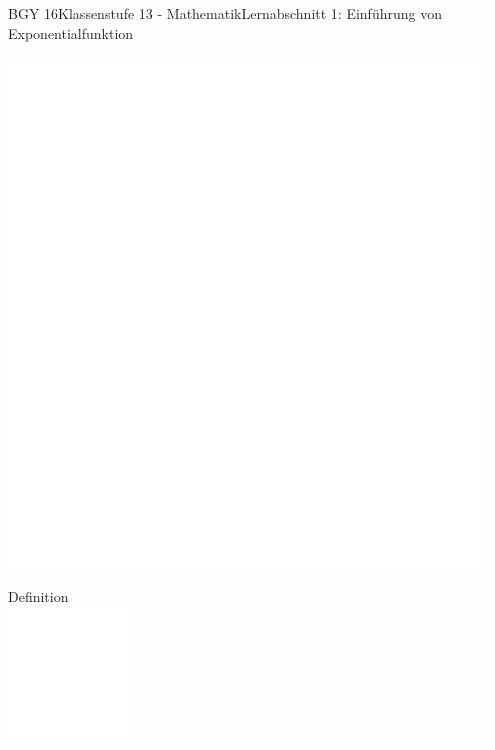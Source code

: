 \documentclass[oneside,openany,headings=optiontotoc,11pt,numbers=noenddot]{scrreprt}
\begin{document}
\begin{worksheet}{BGY 16}{Klassenstufe 13 - Mathematik}{Lernabschnitt 1: Einführung von Exponentialfunktion}
\begin{framed}
			\includegraphics[width=0.95\textwidth]{../../empty.jpg}
		\end{framed}
		\begin{framed}
			\tiny Definition\\
			\includegraphics[width=0.25\textwidth]{../../empty.jpg}
		\end{framed}
	\end{worksheet}
\end{document}

